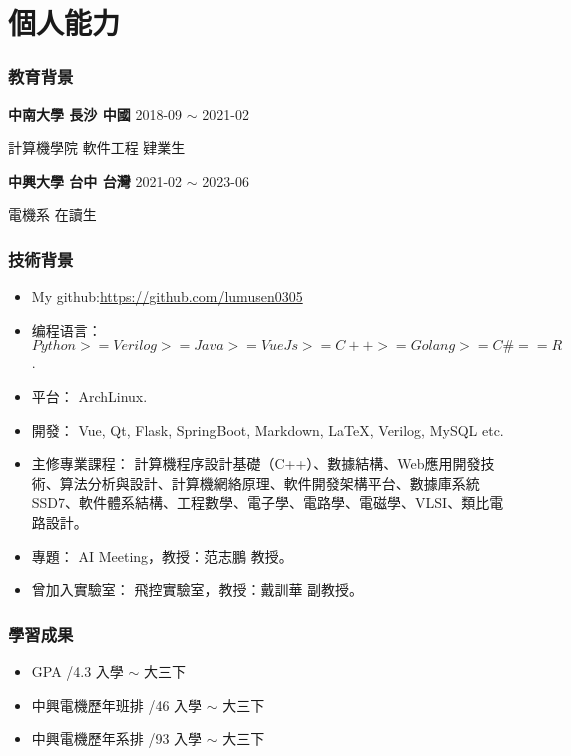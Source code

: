 \documentclass[classical]{einfart}
\begin{document}
\setcounter{tocdepth}{2}
{\tableofcontents}

\newpage

\part{個人能力}

\section{教育背景}
\textbf{中南大學 \quad 長沙 \quad 中國} \hfill 2018-09 $\sim$ 2021-02

計算機學院 \quad 軟件工程 \quad 肄業生

\textbf{中興大學 \quad 台中 \quad 台灣} \hfill 2021-02 $\sim$ 2023-06

電機系 \quad 在讀生


\section{技術背景}

\begin{itemize}[parsep=0.5ex]
  \item My github:\url{https://github.com/lumusen0305}
  \item 编程语言： $Python >= Verilog >= Java  >= VueJs >= C++ >=  Golang >= C\# == R$.
  \item 平台： ArchLinux.
  \item 開發： Vue,  Qt, Flask, SpringBoot, Markdown, LaTeX, Verilog, MySQL etc.
  \item 主修專業課程： 計算機程序設計基礎（C++）、數據結構、Web應用開發技術、算法分析與設計、計算機網絡原理、軟件開發架構平台、數據庫系統SSD7、軟件體系結構、工程數學、電子學、電路學、電磁學、VLSI、類比電路設計。
  \item 專題： AI Meeting，教授：范志鵬 教授。
  \item 曾加入實驗室： 飛控實驗室，教授：戴訓華 副教授。
\end{itemize}

\section{學習成果}
\begin{itemize}[parsep=0.5ex]
  \item GPA  /4.3 \hfill 入學 $\sim$ 大三下
  \item 中興電機歷年班排  /46 \hfill 入學 $\sim$ 大三下
  \item 中興電機歷年系排  /93 \hfill 入學 $\sim$ 大三下
\end{itemize}
\end{document}
